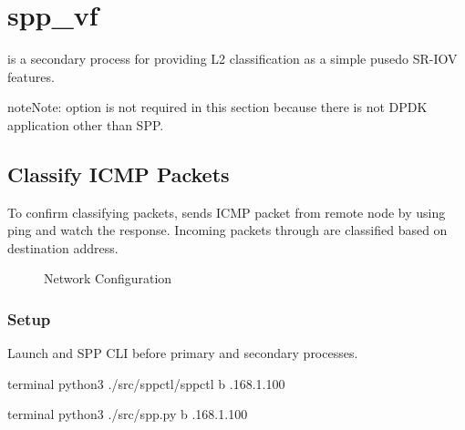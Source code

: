 \documentclass[a4paper,11pt,openany,oneside,english]{sphinxmanual}
\begin{document}
\section{spp\_vf}
\label{\detokenize{usecases/spp_vf:spp-vf}}\label{\detokenize{usecases/spp_vf:spp-usecases-vf}}\label{\detokenize{usecases/spp_vf::doc}}
 is a secondary process for providing L2 classification as a simple
pusedo SR-IOV features.

\begin{sphinxadmonition}{note}{Note:}
 option is not required in this section because there is
not DPDK application other than SPP.
\end{sphinxadmonition}


\subsection{Classify ICMP Packets}
\label{\detokenize{usecases/spp_vf:classify-icmp-packets}}\label{\detokenize{usecases/spp_vf:spp-usecases-vf-cls-icmp}}
To confirm classifying packets, sends ICMP packet from remote node by using
ping and watch the response.
Incoming packets through  are classified based on destination address.

\begin{figure}[htbp]
\centering
\capstart

\noindent{}
\caption{Network Configuration}\label{\detokenize{usecases/spp_vf:id4}}\label{\detokenize{usecases/spp_vf:figure-spp-vf-use-cases-nw-config}}\end{figure}


\subsubsection{Setup}
\label{\detokenize{usecases/spp_vf:setup}}
Launch  and SPP CLI before primary and secondary processes.

\begin{sphinxVerbatim}[commandchars=\\\{\},formatcom=\footnotesize]
 terminal 
 python3 ./src/spp\PYGZhy{}ctl/spp\PYGZhy{}ctl \PYGZhy{}b .168.1.100
\end{sphinxVerbatim}

\begin{sphinxVerbatim}[commandchars=\\\{\},formatcom=\footnotesize]
 terminal 
 python3 ./src/spp.py \PYGZhy{}b .168.1.100
\end{sphinxVerbatim}
\end{document}
